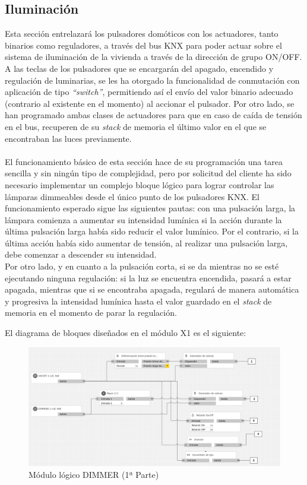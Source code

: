 \subsection{Iluminación} Esta sección entrelazará los pulsadores domóticos con los actuadores, tanto binarios como reguladores, a través del bus KNX para poder actuar sobre el sistema de iluminación de la vivienda a través de la dirección de grupo ON/OFF. A las teclas de los pulsadores que se encargarán del apagado, encendido y regulación de luminarias, se les ha otorgado la funcionalidad de conmutación con aplicación de tipo \textit {“switch”}, permitiendo así el envío del valor binario adecuado (contrario al existente en el momento) al accionar el pulsador. Por otro lado, se han programado ambas clases de actuadores para que en caso de caída de tensión en el bus, recuperen de su \textit {stack} de memoria el último valor en el que se encontraban las luces previamente. \\\\
El funcionamiento básico de esta sección hace de su programación una tarea sencilla y sin ningún tipo de complejidad, pero por solicitud del cliente ha sido necesario implementar un complejo bloque lógico para lograr controlar las lámparas dimmeables desde el único punto de los pulsadores KNX. El funcionamiento esperado sigue las siguientes pautas: con una pulsación larga, la lámpara comienza a aumentar su intensidad lumínica si la acción durante la última pulsación larga había sido reducir el valor lumínico. Por el contrario, si la última acción había sido aumentar de tensión, al realizar una pulsación larga, debe comenzar a descender su intensidad. \\
Por otro lado, y en cuanto a la pulsación corta, si se da mientras no se esté ejecutando ninguna regulación: si la luz se encuentra encendida, pasará a estar apagada, mientras que si se encontraba apagada, regulará de manera automática y progresiva la intensidad lumínica hasta el valor guardado en el \textit {stack} de memoria en el momento de parar la regulación.

 El diagrama de bloques diseñados en el módulo X1 es el siguiente:
\begin{center}
\begin{figure}[H]
\includegraphics[width=1.05\textwidth]{figures/log_dimm_izq.png}   
\caption{Módulo lógico DIMMER (1ª Parte)}
\label{fig:log_dimm_izq}
\end{figure}
\end{center}

